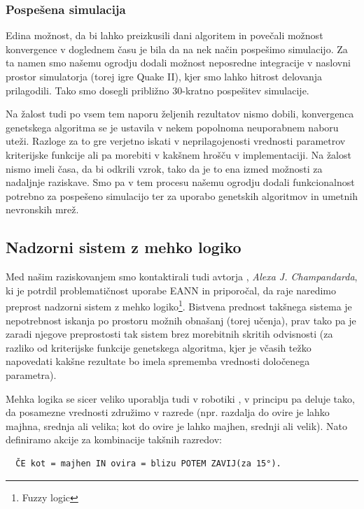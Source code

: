 \documentclass[a4paper,10pt]{article}
\begin{document}
\subsubsection{Pospešena simulacija}

Edina možnost, da bi lahko preizkusili dani algoritem in povečali možnost konvergence v doglednem času je bila da na nek način pospešimo simulacijo. Za ta namen smo našemu ogrodju dodali možnost neposredne integracije v naslovni prostor simulatorja (torej igre Quake II), kjer smo lahko hitrost delovanja prilagodili. Tako smo dosegli približno 30-kratno pospešitev simulacije.

Na žalost tudi po vsem tem naporu željenih rezultatov nismo dobili, konvergenca genetskega algoritma se je ustavila v nekem popolnoma neuporabnem naboru uteži. Razloge za to gre verjetno iskati v neprilagojenosti vrednosti parametrov kriterijske funkcije ali pa morebiti v kakšnem hrošču v implementaciji. Na žalost nismo imeli časa, da bi odkrili vzrok, tako da je to ena izmed možnosti za nadaljnje raziskave. Smo pa v tem procesu našemu ogrodju dodali funkcionalnost potrebno za pospešeno simulacijo ter za uporabo genetskih algoritmov in umetnih nevronskih mrež.

\subsection{Nadzorni sistem z mehko logiko}

Med našim raziskovanjem smo kontaktirali tudi avtorja \cite{champandard02}, \textit{Alexa J. Champandarda}, ki je potrdil problematičnost uporabe EANN in priporočal, da raje naredimo preprost nadzorni sistem z mehko logiko\footnote{Fuzzy logic}. Bistvena prednost takšnega sistema je nepotrebnost iskanja po prostoru možnih obnašanj (torej učenja), prav tako pa je zaradi njegove preprostosti tak sistem brez morebitnih skritih odvisnosti (za razliko od kriterijske funkcije genetskega algoritma, kjer je včasih težko napovedati kakšne rezultate bo imela sprememba vrednosti določenega parametra).

Mehka logika se sicer veliko uporablja tudi v robotiki \cite{grayston06}, v principu pa deluje tako, da posamezne vrednosti združimo v razrede (npr. razdalja do ovire je lahko majhna, srednja ali velika; kot do ovire je lahko majhen, srednji ali velik). Nato definiramo akcije za kombinacije takšnih razredov:

\begin{verbatim}
  ČE kot = majhen IN ovira = blizu POTEM ZAVIJ(za 15°).
\end{verbatim}
\end{document}
